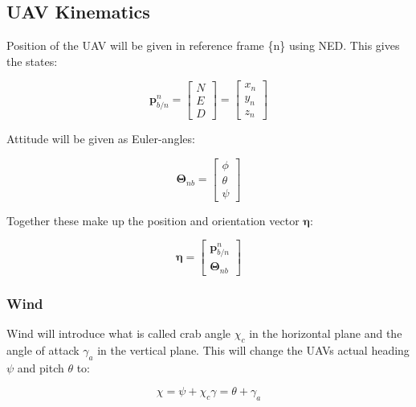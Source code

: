 \documentclass{article}
\begin{document}
\subsection*{UAV Kinematics}
Position of the UAV will be given in reference frame \{n\} using NED. This gives the states:

\begin{equation}
	\bm{p}^n_{b/n} =
	\begin{bmatrix}
		N \\ E \\ D
	\end{bmatrix}
	=
	\begin{bmatrix}
		x_n \\ y_n \\ z_n
	\end{bmatrix}
\end{equation}

Attitude will be given as Euler-angles:

\begin{equation}
	\bm{\Theta}_{nb} = 
	\begin{bmatrix}
		\phi \\ \theta \\ \psi
	\end{bmatrix}
\end{equation}

Together these make up the position and orientation vector $\bm{\eta}$:

\begin{equation}
	\bm{\eta} = 
	\begin{bmatrix}
		\bm{p}^n_{b/n} \\ \bm{\Theta}_{nb}
	\end{bmatrix}
\end{equation}

\subsubsection*{Wind}

Wind will introduce what is called crab angle $\chi_c$ in the horizontal plane and the angle of attack $\gamma_a$ in the vertical plane. This will change the UAVs actual heading $\psi$ and pitch $\theta$ to:

\begin{subequations}
\begin{equation}
	\chi = \psi + \chi_c
\end{equation}
\begin{equation}
	\gamma = \theta + \gamma_a
\end{equation}
\end{subequations}
	
\end{document}

